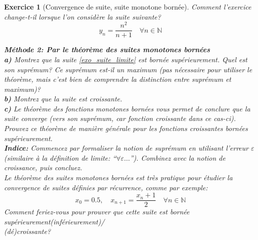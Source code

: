 \documentclass{article}
\newcommand{\Nn}{{\mathbb{N}}}
\theoremstyle{exercice}
\newtheorem{exercice}{Exercice}
\begin{document}
\begin{exercice} [Convergence de suite, suite monotone bornée]
\faLightbulbO \quad {} Comment l'exercice change-t-il lorsque l'on considère la suite suivante?
\begin{equation}
    y_n = \frac{n^2}{n+1} \quad \forall n\in \Nn
\end{equation}

\textbf{Méthode 2: Par le théorème des suites monotones bornées}\\

\textbf{a)} Montrez que la suite \eqref{exo_suite_limite} est bornée supérieurement. Quel est son suprémum? Ce suprémum est-il un maximum (pas nécessaire pour utiliser le théorème, mais c'est bien de comprendre la distinction entre suprémum et maximum)?\\

\textbf{b)} Montrez que la suite est croissante.\\

\textbf{c)} Le théorème des fonctions monotones bornées vous permet de conclure que la suite converge (vers son suprémum, car fonction croissante dans ce cas-ci). \\ Prouvez ce théorème de manière générale pour les fonctions croissantes bornées supérieurement.\\
\textbf{Indice:} Commencez par formaliser la notion de suprémum en utilisant l'erreur $\varepsilon$ (similaire à la définition de limite: ``$\forall \varepsilon ...$''). Combinez avec la notion de croissance, puis concluez.\\

\faLightbulbO \quad {} Le théorème des suites monotones bornées est très pratique pour étudier la convergence de suites définies par récurrence, comme par exemple:
\begin{equation}
    x_0 = 0.5, \quad x_{n+1} = \frac{x_n + 1}{2} \quad \forall n\in \Nn
\end{equation}
Comment feriez-vous pour prouver que cette suite est bornée supérieurement(inférieurement)/\\ (dé)croissante?

\end{exercice}
\end{document}
